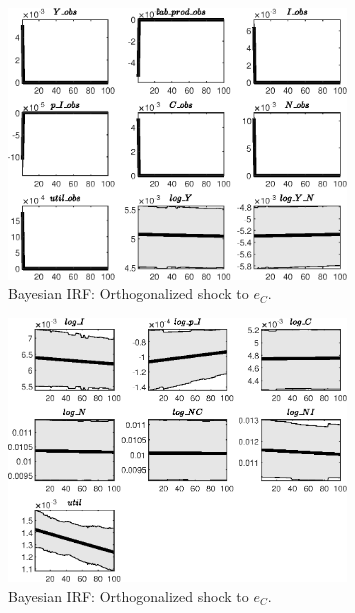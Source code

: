 \begin{figure}[H]
\centering 
\includegraphics[width=0.80\textwidth]{BRS_imp_mobility/Output/BRS_imp_mobility_Bayesian_IRF_e_C_1}
\caption{Bayesian IRF: Orthogonalized shock to ${e_C}$.}
\label{Fig:BayesianIRF:e_C:1}
\end{figure}
 
\begin{figure}[H]
\centering 
\includegraphics[width=0.80\textwidth]{BRS_imp_mobility/Output/BRS_imp_mobility_Bayesian_IRF_e_C_2}
\caption{Bayesian IRF: Orthogonalized shock to ${e_C}$.}
\label{Fig:BayesianIRF:e_C:2}
\end{figure}
 
